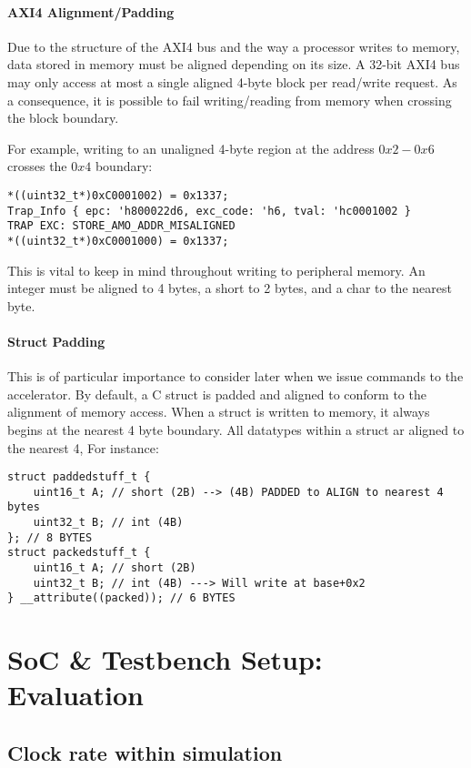 \documentclass[a4paper,8pt]{report}
\begin{document}

\subsubsection{AXI4 Alignment/Padding}
Due to the structure of the AXI4 bus and the way a processor writes to memory,
data stored in memory must be aligned depending on its size.
A 32-bit AXI4 bus may only access at most a single aligned
4-byte block per read/write request. As a consequence, it is possible to fail
writing/reading from memory when crossing the block boundary.

For example, writing to an unaligned 4-byte region at the address $0x2-0x6$ crosses
the $0x4$ boundary:
\begin{verbatim}
*((uint32_t*)0xC0001002) = 0x1337;
Trap_Info { epc: 'h800022d6, exc_code: 'h6, tval: 'hc0001002 }
TRAP EXC: STORE_AMO_ADDR_MISALIGNED
*((uint32_t*)0xC0001000) = 0x1337;
\end{verbatim}

This is vital to keep in mind throughout writing to peripheral memory. An
integer must be aligned to 4 bytes, a short to 2 bytes, and a char to the
nearest byte. 

\subsubsection{Struct Padding}
This is of particular importance to consider later when we issue commands to the
accelerator. By default, a C struct is padded and aligned to conform to the
alignment of memory access. When a struct is written to memory, it always begins
at the nearest 4 byte boundary. All datatypes within a struct ar aligned to the
nearest 4, For instance:

\begin{verbatim}
struct paddedstuff_t {
    uint16_t A; // short (2B) --> (4B) PADDED to ALIGN to nearest 4 bytes
    uint32_t B; // int (4B)
}; // 8 BYTES
struct packedstuff_t {
    uint16_t A; // short (2B)
    uint32_t B; // int (4B) ---> Will write at base+0x2
} __attribute((packed)); // 6 BYTES
\end{verbatim}


\chapter{SoC \& Testbench Setup: Evaluation}
\section{Clock rate within simulation}
\end{document}
